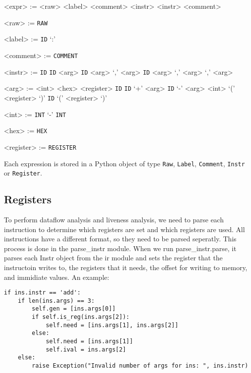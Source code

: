 \begin{grammar}
<expr> := <raw>
\alt <label>
\alt <comment>
\alt <instr>
\alt <instr> <comment>

<raw> := \verb!RAW!

<label> := \verb!ID! `:'

<comment> := \verb!COMMENT!

<instr> := \verb!ID!
\alt \verb!ID! <arg>
\alt \verb!ID! <arg> `,' <arg>
\alt \verb!ID! <arg> `,' <arg> `,' <arg>

<arg> := <int>
\alt <hex>
\alt <register>
\alt \verb!ID!
\alt \verb!ID! `+' <arg>
\alt \verb!ID! `-' <arg>
\alt <int> `(' <register> `)'
\alt \verb!ID!  `(' <register> `)'

<int> := \verb!INT!
\alt `-' \verb!INT!

<hex> := \verb!HEX!

<register> := \verb!REGISTER!
\end{grammar}

Each expression is stored in a Python object of type \verb!Raw!, \verb!Label!, \verb!Comment!, \verb!Instr! or \verb!Register!.

\subsection{Registers}
To perform dataflow analysis and liveness analysis, we need to parse each 
instruction to determine which registers are set and which registers are used. 
All instructions have a different format, so they need to be parsed seperatly. 
This process is done in the parse_instr module. When we run parse\_instr.parse,
it parses each Instr object from the ir module and sets the register that the
instructoin writes to, the registers that it needs, the offset for writing to 
memory, and immidiate values. An example:
\begin{lstlisting}
if ins.instr == 'add':  
    if len(ins.args) == 3:
        self.gen = [ins.args[0]]
        if self.is_reg(ins.args[2]):
            self.need = [ins.args[1], ins.args[2]]
        else: 
            self.need = [ins.args[1]]
            self.ival = ins.args[2]
    else:
        raise Exception("Invalid number of args for ins: ", ins.instr)   
\end{lstlisting}
